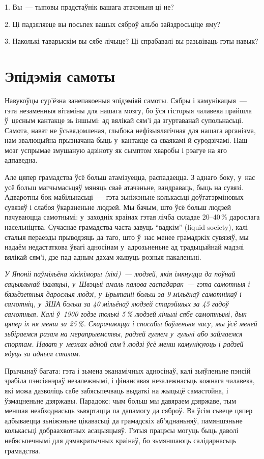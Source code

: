 1. Вы~--- тыповы прадстаўнік вашага атачэньня ці не?

2. Ці падзяляеце вы посьпех вашых сяброў альбо зайздросьціце яму?

3. Наколькі таварыскім вы сябе лічыце? Ці спрабавалі вы разьвіваць гэты навык?


\section{Эпідэмія самоты}

Навукоўцы сур'ёзна занепакоеныя эпідэміяй самоты. Сябры і камунікацыя~--- гэта незаменныя вітаміны для нашага мозгу, бо ўся гісторыя чалавека прайшла ў~цесным кантакце зь іншымі: ад вялікай сям'і да згуртаванай супольнасьці. Самота, нават не ўсьвядомленая, глыбока нефізыялягічная для нашага арганізма, нам эвалюцыйна прызначана быць у~кантакце са сваякамі й суродзічамі. Наш мозг успрымае змушаную адзіноту як сымптом хваробы і рэагуе на яго адпаведна.

Але цяпер грамадства ўсё больш атамізуецца, распадаецца. З аднаго боку, у~нас усё больш магчымасьцяў мяняць сваё атачэньне, вандраваць, быць на сувязі. Адваротны бок мабільнасьці~--- гэта зьніжэньне колькасьці доўгатэрміновых сувязяў і слабоя ўкараненьне людзей. Мы бачым, што ўсё больш людзей пачуваюцца самотнымі: у~заходніх краінах гэтая лічба складае 20--40\,\% дарослага насельніцтва. Сучаснае грамадства часта завуць ``вадкім'' (liquid society), калі сталыя пераезды прыводзяць да таго, што ў~нас менее грамадзкіх сувязяў, мы надаём недастаткова ўвагі адносінам у~адрозьненьне ад традыцыйнай мадэлі вялікай сям'і, дзе пад адным дахам жывуць розныя пакаленьні.

\emph{У Японіі паўмільёна хікікіморы (хікі)~--- людзей, якія імкнуцца да поўнай сацыяльнай ізаляцыі, у~Швэцыі амаль палова гаспадарак~--- гэта самотныя і бязьдзетныя дарослыя людзі, у~Брытаніі больш за 9 мільёнаў самотнікаў і самотніц, у~ЗША больш за 40 мільёнаў людзей старэйшых за 45 гадоў самотныя. Калі ў~1900 годзе толькі 5\,\% людзей лічылі сябе самотнымі, дык цяпер іх ня менш за 25\,\%. Скарачаюцца і спосабы баўленьня часу, мы ўсё меней зьбіраемся разам на мерапрыемствы, радзей гуляем у~гульні або займаемся спортам. Нават у~межах адной сям'і людзі ўсё менш камунікуюць і радзей ядуць за адным сталом.}

Прычынаў багата: гэта і зьмена эканамічных адносінаў, калі зьяўленьне пэнсій зрабіла пэнсіянэраў незалежнымі, і фінансавая незалежнасьць кожнага чалавека, які можа дазволіць сабе забясьпечваць выдаткі на жыцьцё самастойна, і ўзмацненьне дзяржавы. Парадокс: чым больш мы давяраем дзяржаве, тым меншая неабходнасьць зьвяртацца па дапамогу да сяброў. Ва ўсім сьвеце цяпер адбываецца зьніжэньне цікавасьці да грамадскіх аб'яднаньняў, памяншэньне колькасьці добраахвотных асацыяцыяў. Гэтыя працэсы могуць быць даволі небясьпечнымі для дэмакратычных краінаў, бо зьмяншаюць салідарнасьць грамадства.

